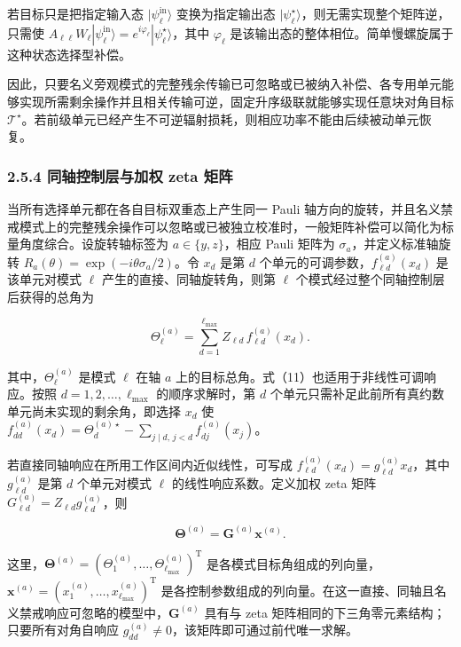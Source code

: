 \documentclass[
  UTF8,
  zihao=-4,
  fontset=fandol]{ctexart}
\begin{document}
若目标只是把指定输入态 \(|\psi_\ell^{\mathrm{in}}\rangle\)
变换为指定输出态
\(|\psi_\ell^\star\rangle\)，则无需实现整个矩阵逆，只需使
\(A_{\ell\ell}W_\ell|\psi_\ell^{\mathrm{in}}\rangle=e^{i\varphi_\ell}|\psi_\ell^\star\rangle\)，其中
\(\varphi_\ell\)
是该输出态的整体相位。简单慢螺旋属于这种状态选择型补偿。

因此，只要名义旁观模式的完整残余传输已可忽略或已被纳入补偿、各专用单元能够实现所需剩余操作并且相关传输可逆，固定升序级联就能够实现任意块对角目标
\(\mathcal T^\star\)。若前级单元已经产生不可逆辐射损耗，则相应功率不能由后续被动单元恢复。

\hypertarget{ux540cux8f74ux63a7ux5236ux5c42ux4e0eux52a0ux6743-zeta-ux77e9ux9635}{%
\subsubsection{2.5.4 同轴控制层与加权 zeta
矩阵}\label{ux540cux8f74ux63a7ux5236ux5c42ux4e0eux52a0ux6743-zeta-ux77e9ux9635}}

当所有选择单元都在各自目标双重态上产生同一 Pauli
轴方向的旋转，并且名义禁戒模式上的完整残余操作可以忽略或已被独立校准时，一般矩阵补偿可以简化为标量角度综合。设旋转轴标签为
\(a\in\{y,z\}\)，相应 Pauli 矩阵为 \(\sigma_a\)，并定义标准轴旋转
\(R_a(\theta)=\exp(-i\theta\sigma_a/2)\)。令 \(x_d\) 是第 \(d\)
个单元的可调参数，\(f_{\ell d}^{(a)}(x_d)\) 是该单元对模式 \(\ell\)
产生的直接、同轴旋转角，则第 \(\ell\)
个模式经过整个同轴控制层后获得的总角为

\[
\Theta_\ell^{(a)}
=
\sum_{d=1}^{\ell_{\max}}
Z_{\ell d}\,
f_{\ell d}^{(a)}(x_d).
\tag{11}
\]

其中，\(\Theta_\ell^{(a)}\) 是模式 \(\ell\) 在轴 \(a\)
上的目标总角。式（11）也适用于非线性可调响应。按照
\(d=1,2,\ldots,\ell_{\max}\) 的顺序求解时，第 \(d\)
个单元只需补足此前所有真约数单元尚未实现的剩余角，即选择 \(x_d\) 使
\(f_{dd}^{(a)}(x_d)=\Theta_d^{(a)\star}-\sum_{j\mid d,\,j<d}f_{dj}^{(a)}(x_j)\)。

若直接同轴响应在所用工作区间内近似线性，可写成
\(f_{\ell d}^{(a)}(x_d)=g_{\ell d}^{(a)}x_d\)，其中 \(g_{\ell d}^{(a)}\)
是第 \(d\) 个单元对模式 \(\ell\) 的线性响应系数。定义加权 zeta 矩阵
\(G_{\ell d}^{(a)}=Z_{\ell d}g_{\ell d}^{(a)}\)，则

\[
\boldsymbol{\Theta}^{(a)}
=
\mathbf G^{(a)}
\mathbf x^{(a)}.
\tag{12}
\]

这里，\(\boldsymbol{\Theta}^{(a)}=(\Theta_1^{(a)},\ldots,\Theta_{\ell_{\max}}^{(a)})^{\mathrm T}\)
是各模式目标角组成的列向量，\(\mathbf x^{(a)}=(x_1^{(a)},\ldots,x_{\ell_{\max}}^{(a)})^{\mathrm T}\)
是各控制参数组成的列向量。在这一直接、同轴且名义禁戒响应可忽略的模型中，\(\mathbf G^{(a)}\)
具有与 zeta 矩阵相同的下三角零元素结构；只要所有对角自响应
\(g_{dd}^{(a)}\neq0\)，该矩阵即可通过前代唯一求解。
\end{document}
